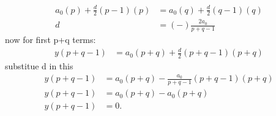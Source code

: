\documentclass[journal,12pt,twocolumn]{IEEEtran}
\begin{document}
\begin{align}
a_0(p)+\frac{d}{2}(p-1)(p)&=a_0(q)+\frac{d}{2}(q-1)(q)\\
d&=(-)\frac{2a_0}{p+q-1}
\end{align}
now for first p+q terms:\\
\begin{align}
y(p+q-1)&=a_0(p+q)+\frac{d}{2}(p+q-1)(p+q)
\end{align}
substitue d in this\\
\begin{align}
y(p+q-1)&=a_0(p+q)-\frac{a_0}{p+q-1}(p+q-1)(p+q)\\
y(p+q-1)&=a_0(p+q)-a_0(p+q)\\
y(p+q-1)&=0.
\end{align}
\end{document}

